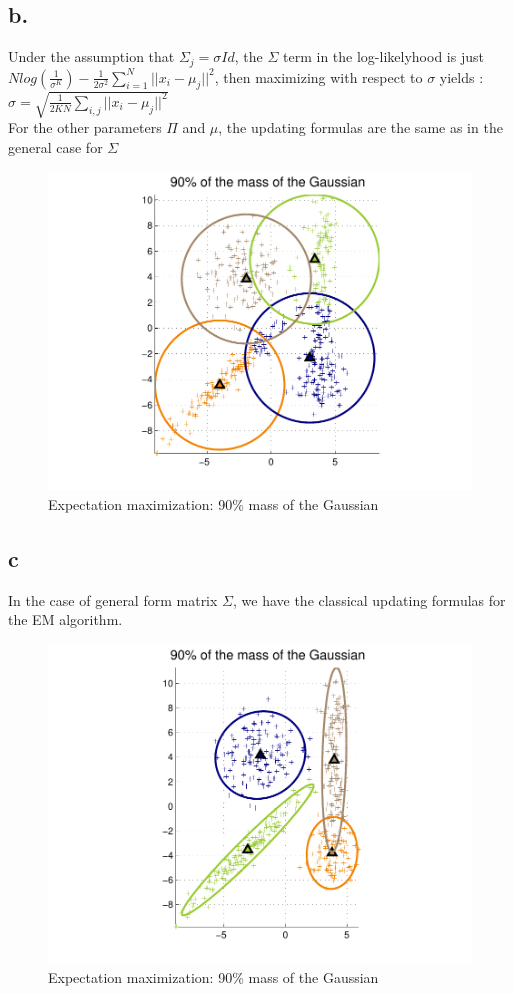 \documentclass[12pt]{article}
\begin{document}
\subsection*{b.}
Under the assumption that $\Sigma_{j} = \sigma Id$, the $\Sigma$ term in the log-likelyhood is just ~\\
$N log(\frac{1}{\sigma^{K}})-\frac{1}{2\sigma^{2}} \sum \limits_{i=1}^N ||x_{i}-\mu_{j}||^{2}$, then maximizing with respect to $\sigma$ yields :~\\
$\sigma=\sqrt{\frac{1}{2KN}\sum \limits_{i,j} ||x_{i}-\mu_{j}||^2}$~\\
For the other parameters $\Pi$ and $\mu$, the updating formulas are the same as in the general case for $\Sigma$
\begin{figure}[h!]
	\centering 
	\includegraphics[width=.8\textwidth]{./pics/3b.pdf}
	\caption{Expectation maximization: 90\% mass of the Gaussian}
	\label{fig:3b}
\end{figure}

\subsection*{c}
In the case of general form matrix $\Sigma$, we have the classical updating formulas for the EM algorithm.
\begin{figure}[h!]
	\centering 
	\includegraphics[width=.8\textwidth]{./pics/3c.pdf}
	\caption{Expectation maximization: 90\% mass of the Gaussian}
	\label{fig:3c}
\end{figure}
\end{document}
